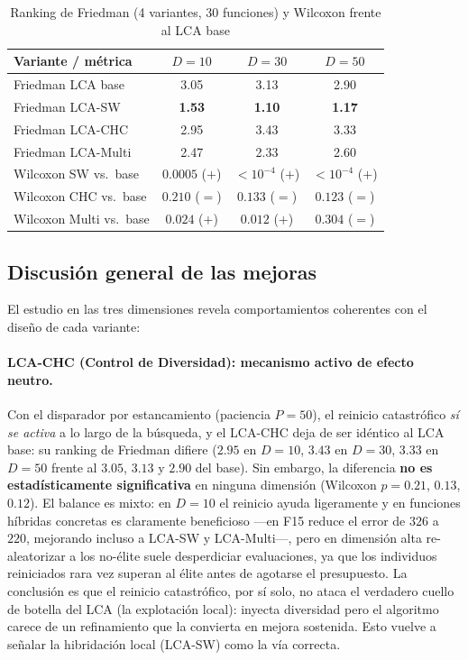 \begin{table}[h!]
\centering
\caption{Ranking de Friedman (4 variantes, 30 funciones) y Wilcoxon frente al LCA base}
\label{tab:mejoras_friedman}
\renewcommand{\arraystretch}{1.3}
\small
\begin{tabular}{@{}lccc@{}}
\toprule
\textbf{Variante / métrica} & \textbf{$D=10$} & \textbf{$D=30$} & \textbf{$D=50$} \\
\midrule
Friedman LCA base   & 3.05 & 3.13 & 2.90 \\
Friedman LCA-SW     & \textbf{1.53} & \textbf{1.10} & \textbf{1.17} \\
Friedman LCA-CHC    & 2.95 & 3.43 & 3.33 \\
Friedman LCA-Multi  & 2.47 & 2.33 & 2.60 \\
\midrule
Wilcoxon SW vs.\ base    & $0.0005$ ($+$) & $<10^{-4}$ ($+$) & $<10^{-4}$ ($+$) \\
Wilcoxon CHC vs.\ base   & $0.210$ ($=$)  & $0.133$ ($=$)   & $0.123$ ($=$)   \\
Wilcoxon Multi vs.\ base & $0.024$ ($+$)  & $0.012$ ($+$)   & $0.304$ ($=$)   \\
\bottomrule
\end{tabular}
\end{table}

\subsection{Discusión general de las mejoras}

El estudio en las tres dimensiones revela comportamientos coherentes con el diseño de cada
variante:

\paragraph{LCA-CHC (Control de Diversidad): mecanismo activo de efecto neutro.}
Con el disparador por estancamiento (paciencia $P=50$), el reinicio catastrófico \emph{sí se
activa} a lo largo de la búsqueda, y el LCA-CHC deja de ser idéntico al LCA base: su ranking
de Friedman difiere ($2.95$ en $D=10$, $3.43$ en $D=30$, $3.33$ en $D=50$ frente al $3.05$,
$3.13$ y $2.90$ del base). Sin embargo, la diferencia \textbf{no es estadísticamente
significativa} en ninguna dimensión (Wilcoxon $p=0.21$, $0.13$, $0.12$). El balance es mixto:
en $D=10$ el reinicio ayuda ligeramente y en funciones híbridas concretas es claramente
beneficioso ---en F15 reduce el error de $326$ a $220$, mejorando incluso a LCA-SW y
LCA-Multi---, pero en dimensión alta re-aleatorizar a los no-élite suele desperdiciar
evaluaciones, ya que los individuos reiniciados rara vez superan al élite antes de agotarse el
presupuesto. La conclusión es que el reinicio catastrófico, por sí solo, no ataca el verdadero
cuello de botella del LCA (la explotación local): inyecta diversidad pero el algoritmo carece
de un refinamiento que la convierta en mejora sostenida. Esto vuelve a señalar la hibridación
local (LCA-SW) como la vía correcta.

